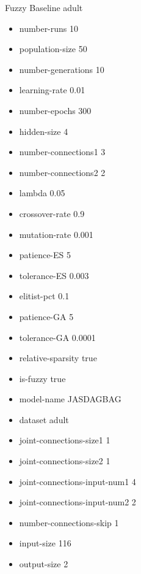 Fuzzy Baseline
adult
\begin{itemize}
\item number-runs 10
\item population-size 50
\item number-generations 10
\item learning-rate 0.01
\item number-epochs 300
\item hidden-size 4
\item number-connections1 3
\item number-connections2 2
\item lambda 0.05
\item crossover-rate 0.9
\item mutation-rate 0.001
\item patience-ES 5
\item tolerance-ES 0.003
\item elitist-pct 0.1
\item patience-GA 5
\item tolerance-GA 0.0001
\item relative-sparsity true
\item is-fuzzy true
\item model-name JASDAGBAG
\item dataset adult
\item joint-connections-size1 1
\item joint-connections-size2 1
\item joint-connections-input-num1 4
\item joint-connections-input-num2 2
\item number-connections-skip 1
\item input-size 116
\item output-size 2
\end{itemize}

